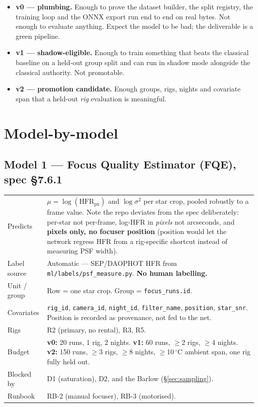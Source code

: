 \documentclass[11pt]{article}
\newcommand{\co}[1]{\texttt{\small #1}}
\begin{document}
\begin{itemize}
\item \textbf{v0 --- plumbing.} Enough to prove the dataset builder, the split
      registry, the training loop and the ONNX export run end to end on real
      bytes. Not enough to evaluate anything. Expect the model to be bad;
      the deliverable is a green pipeline.
\item \textbf{v1 --- shadow-eligible.} Enough to train something that beats the
      classical baseline on a held-out group split and can run in shadow mode
      alongside the classical authority. Not promotable.
\item \textbf{v2 --- promotion candidate.} Enough groups, rigs, nights and
      covariate span that a held-out \emph{rig} evaluation is meaningful.
\end{itemize}

\section{Model-by-model}

\subsection{Model 1 --- Focus Quality Estimator (FQE), spec \S7.6.1}\label{m:fqe}

\begin{center}
\small
\begin{tabular}{@{}p{}p{}@{}}
\toprule
Predicts & $\mu = \log(\mathrm{HFR}_{\mathrm{px}})$ and $\log\sigma^2$ per star crop, pooled robustly to a frame value. Note the repo deviates from the spec deliberately: per-star not per-frame, log-HFR in \emph{pixels} not arcseconds, and \textbf{pixels only, no focuser position} (position would let the network regress HFR from a rig-specific shortcut instead of measuring PSF width). \\
Label source & Automatic --- SEP/DAOPHOT HFR from \co{ml/labels/psf\_measure.py}. \textbf{No human labelling.} \\
Unit / group & Row = one star crop. Group = \co{focus\_runs.id}. \\
Covariates & \co{rig\_id}, \co{camera\_id}, \co{night\_id}, \co{filter\_name}, \co{position}, \co{star\_snr}. Position is recorded as provenance, not fed to the net. \\
Rigs & R2 (primary, no rental), R3, R5. \\
Budget & \textbf{v0:} 20 runs, 1 rig, 2 nights. \textbf{v1:} 60 runs, $\geq$2 rigs, $\geq$4 nights. \textbf{v2:} 150 runs, $\geq$3 rigs, $\geq$8 nights, $\geq$10\,$^\circ$C ambient span, one rig fully held out. \\
Blocked by & D1 (saturation), D2, and the Barlow (\S\ref{sec:sampling}). \\
Runbook & RB-2 (manual focuser), RB-3 (motorised). \\
\bottomrule
\end{tabular}
\end{center}
\end{document}
